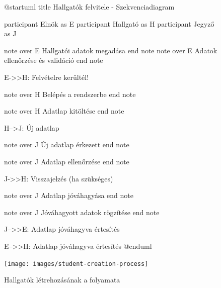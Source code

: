 \documentclass[a4paper,12pt]{article}
\begin{document}
\begin{figure}[h!]
	\centering
	\begin{plantuml}
@startuml
title Hallgatók felvitele - Szekvenciadiagram

participant Elnök as E
participant Hallgató as H
participant Jegyző as J

note over E
Hallgatói adatok megadása
end note
note over E
Adatok ellenőrzése és validáció
end note

E->>H: Felvételre kerültél!

note over H 
Belépés a rendszerbe
end note

note over H 
Adatlap kitöltése
end note

H-->J: Új adatlap

note over J 
Új adatlap érkezett
end note

note over J 
Adatlap ellenőrzése
end note

J->>H: Visszajelzés (ha szükséges)

note over J 
Adatlap jóváhagyása
end note

note over J 
Jóváhagyott adatok rögzítése
end note

J-->>E: Adatlap jóváhagyva értesítés

E-->>H: Adatlap jóváhagyva értesítés
@enduml
	\end{plantuml}
	\texttt{[image: images/student-creation-process]}
	\caption{Hallgatók létrehozásának a folyamata}
	\label{fig:student-creation-process}
\end{figure}
\end{document}
